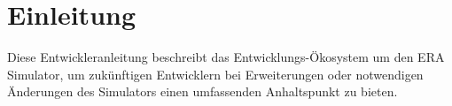 
\section{Einleitung}

Diese Entwickleranleitung beschreibt das Entwicklungs-Ökosystem um den ERA
Simulator, um zukünftigen Entwicklern bei Erweiterungen oder notwendigen
Änderungen des Simulators einen umfassenden Anhaltspunkt zu bieten.
